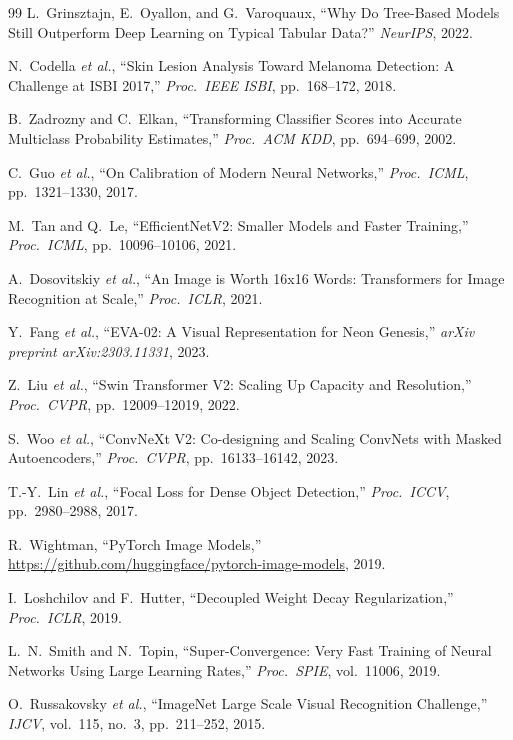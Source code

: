 \documentclass[conference]{IEEEtran}
\begin{document}
\begin{thebibliography}{99}
L.~Grinsztajn, E.~Oyallon, and G.~Varoquaux,
``Why Do Tree-Based Models Still Outperform Deep Learning on Typical
Tabular Data?''
\emph{NeurIPS}, 2022.

N.~Codella \emph{et al.},
``Skin Lesion Analysis Toward Melanoma Detection: A Challenge at
ISBI 2017,''
\emph{Proc.\ IEEE ISBI}, pp.~168--172, 2018.

B.~Zadrozny and C.~Elkan,
``Transforming Classifier Scores into Accurate Multiclass Probability
Estimates,''
\emph{Proc.\ ACM KDD}, pp.~694--699, 2002.

C.~Guo \emph{et al.},
``On Calibration of Modern Neural Networks,''
\emph{Proc.\ ICML}, pp.~1321--1330, 2017.

M.~Tan and Q.~Le,
``EfficientNetV2: Smaller Models and Faster Training,''
\emph{Proc.\ ICML}, pp.~10096--10106, 2021.

A.~Dosovitskiy \emph{et al.},
``An Image is Worth 16x16 Words: Transformers for Image Recognition
at Scale,''
\emph{Proc.\ ICLR}, 2021.

Y.~Fang \emph{et al.},
``EVA-02: A Visual Representation for Neon Genesis,''
\emph{arXiv preprint arXiv:2303.11331}, 2023.

Z.~Liu \emph{et al.},
``Swin Transformer V2: Scaling Up Capacity and Resolution,''
\emph{Proc.\ CVPR}, pp.~12009--12019, 2022.

S.~Woo \emph{et al.},
``ConvNeXt V2: Co-designing and Scaling ConvNets with Masked
Autoencoders,''
\emph{Proc.\ CVPR}, pp.~16133--16142, 2023.

T.-Y.~Lin \emph{et al.},
``Focal Loss for Dense Object Detection,''
\emph{Proc.\ ICCV}, pp.~2980--2988, 2017.

R.~Wightman,
``PyTorch Image Models,''
\url{https://github.com/huggingface/pytorch-image-models}, 2019.

I.~Loshchilov and F.~Hutter,
``Decoupled Weight Decay Regularization,''
\emph{Proc.\ ICLR}, 2019.

L.~N.~Smith and N.~Topin,
``Super-Convergence: Very Fast Training of Neural Networks Using
Large Learning Rates,''
\emph{Proc.\ SPIE}, vol.~11006, 2019.

O.~Russakovsky \emph{et al.},
``ImageNet Large Scale Visual Recognition Challenge,''
\emph{IJCV}, vol.~115, no.~3, pp.~211--252, 2015.


\end{thebibliography}
\end{document}
